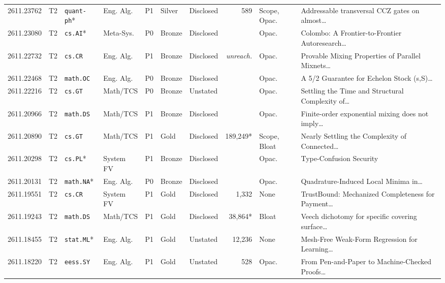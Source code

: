 \documentclass[11pt,letterpaper]{article}
\begin{document}
\begin{longtable}{lllllllrl>{\raggedright\arraybackslash}p{4.05cm}}
2611.23762 & T2 & \texttt{quant-ph}* & Eng. Alg. & P1 & Silver & Disclosed & 589 & Scope, Opac. & Addressable transversal CCZ gates on almost\dots~\cite{arxiv2611_23762} \\
2611.23080 & T2 & \texttt{cs.AI}* & Meta-Sys. & P0 & Bronze & Disclosed & \textemdash{} & Opac. & Colombo: A Frontier-to-Frontier Autoresearch\dots~\cite{arxiv2611_23080} \\
2611.22732 & T2 & \texttt{cs.CR} & Eng. Alg. & P1 & Bronze & Disclosed & \emph{unreach.} & Opac. & Provable Mixing Properties of Parallel Mixnets\dots~\cite{arxiv2611_22732} \\
2611.22468 & T2 & \texttt{math.OC} & Eng. Alg. & P0 & Bronze & Disclosed & \textemdash{} & Opac. & A 5/2 Guarantee for Echelon Stock (s,S)\dots~\cite{arxiv2611_22468} \\
2611.22216 & T2 & \texttt{cs.GT} & Math/TCS & P0 & Bronze & Unstated & \textemdash{} & Opac. & Settling the Time and Structural Complexity of\dots~\cite{arxiv2611_22216} \\
2611.20966 & T2 & \texttt{math.DS} & Math/TCS & P1 & Bronze & Disclosed & \textemdash{} & Opac. & Finite-order exponential mixing does not imply\dots~\cite{arxiv2611_20966} \\
2611.20890 & T2 & \texttt{cs.GT} & Math/TCS & P1 & Gold & Disclosed & 189,249* & Scope, Bloat & Nearly Settling the Complexity of Connected\dots~\cite{arxiv2611_20890} \\
2611.20298 & T2 & \texttt{cs.PL}* & System FV & P1 & Bronze & Disclosed & \textemdash{} & Opac. & Type-Confusion Security~\cite{arxiv2611_20298} \\
2611.20131 & T2 & \texttt{math.NA}* & Eng. Alg. & P0 & Bronze & Disclosed & \textemdash{} & Opac. & Quadrature-Induced Local Minima in\dots~\cite{arxiv2611_20131} \\
2611.19551 & T2 & \texttt{cs.CR} & System FV & P1 & Gold & Disclosed & 1,332 & None & TrustBound: Mechanized Completeness for Payment\dots~\cite{arxiv2611_19551} \\
2611.19243 & T2 & \texttt{math.DS} & Math/TCS & P1 & Gold & Disclosed & 38,864* & Bloat & Veech dichotomy for specific covering surface\dots~\cite{arxiv2611_19243} \\
2611.18455 & T2 & \texttt{stat.ML}* & Eng. Alg. & P1 & Gold & Unstated & 12,236 & None & Mesh-Free Weak-Form Regression for Learning\dots~\cite{arxiv2611_18455} \\
2611.18220 & T2 & \texttt{eess.SY} & Eng. Alg. & P1 & Gold & Unstated & 528 & Opac. & From Pen-and-Paper to Machine-Checked Proofs\dots~\cite{arxiv2611_18220} \\

\end{longtable}
\end{document}
